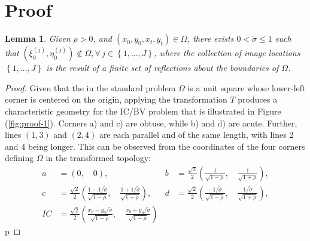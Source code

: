 \documentclass[10pt]{article}
\newtheorem{lemma}{Lemma}
\begin{document}
\section{Proof}
\begin{lemma}
  Given $\rho > 0$, and $(x_0, y_0, x_t, y_t) \in \Omega$, there
  exists $0 < \tilde{\sigma} \leq 1$ such that
  $(\xi_0^{(j)}, \eta_0^{(j)}) \notin \Omega, \forall \, j\in
  \left\{1, \ldots, J\right\}$, where the collection of image
  locations $\left\{1, \ldots, J\right\}$ is the result of a finite
  set of reflections about the boundaries of $\Omega$.
\end{lemma}

\begin{proof}
  Given that the in the standard problem $\Omega$ is a unit square
  whose lower-left corner is centered on the origin, applying the
  transformation $T$ produces a characteristic geometry for the IC/BV
  problem that is illustrated in Figure (\ref{fig:proof-1}). Corners
  a) and c) are obtuse, while b) and d) are acute. Further, lines
  $(1,3)$ and $(2, 4)$ are each parallel and of the same length, with
  lines 2 and 4 being longer. This can be observed from the
  coordinates of the four corners defining $\Omega$ in the transformed
  topology:
  \begin{align*}
    a &= (0,\quad 0),& 
                       b &= \frac{\sqrt{2}}{2} \left( \frac{1}{\sqrt{1-\rho}},\quad \frac{1}{\sqrt{1+\rho}} \right), \\
    c &= \frac{\sqrt{2}}{2} \left( \frac{1-1/\tilde{\sigma}}{\sqrt{1-\rho}},\quad \frac{1+1/\tilde{\sigma}}{\sqrt{1+\rho}} \right),&
                                                                                                                                     d &= \frac{\sqrt{2}}{2} \left( \frac{-1/\tilde{\sigma}}{\sqrt{1-\rho}},\quad \frac{1/\tilde{\sigma}}{\sqrt{1+\rho}} \right), \\
    IC &= \frac{\sqrt{2}}{2} \left( \frac{x_0 - y_0/\tilde{\sigma}}{\sqrt{1-\rho}},\quad \frac{x_0 + y_0/\tilde{\sigma}}{\sqrt{1-\rho}} \right)
  \end{align*}p


\end{proof}
\end{document}
